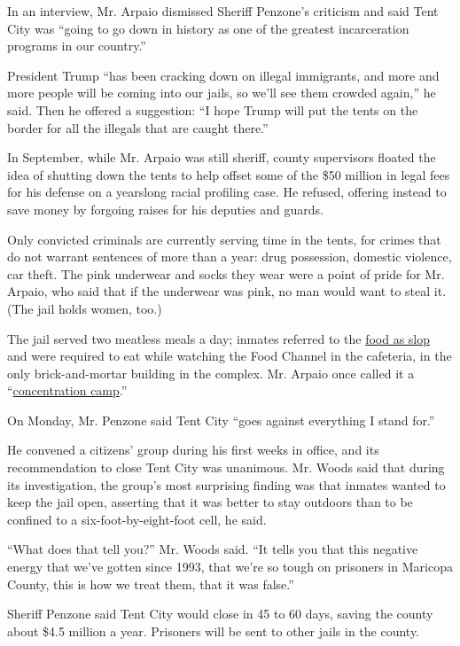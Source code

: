 In an interview, Mr. Arpaio dismissed Sheriff Penzone's criticism and
said Tent City was ``going to go down in history as one of the greatest
incarceration programs in our country.''

President Trump ``has been cracking down on illegal immigrants, and more
and more people will be coming into our jails, so we'll see them crowded
again,'' he said. Then he offered a suggestion: ``I hope Trump will put
the tents on the border for all the illegals that are caught there.''

In September, while Mr. Arpaio was still sheriff, county supervisors
floated the idea of shutting down the tents to help offset some of the
\$50 million in legal fees for his defense on a yearslong racial
profiling case. He refused, offering instead to save money by forgoing
raises for his deputies and guards.

Only convicted criminals are currently serving time in the tents, for
crimes that do not warrant sentences of more than a year: drug
possession, domestic violence, car theft. The pink underwear and socks
they wear were a point of pride for Mr. Arpaio, who said that if the
underwear was pink, no man would want to steal it. (The jail holds
women, too.)

The jail served two meatless meals a day; inmates referred to the
\href{https://www.facebookcorewwwi.onion/ThisIsFernanda/videos/vb.656347072/10153670451937073/?type=2\&theater}{food
as slop} and were required to eat while watching the Food Channel in the
cafeteria, in the only brick-and-mortar building in the complex. Mr.
Arpaio once called it a
``\href{https://www.youtube.com/watch?v=1fj3mRGQ0ow}{concentration
camp}.''

On Monday, Mr. Penzone said Tent City ``goes against everything I stand
for.''

He convened a citizens' group during his first weeks in office, and its
recommendation to close Tent City was unanimous. Mr. Woods said that
during its investigation, the group's most surprising finding was that
inmates wanted to keep the jail open, asserting that it was better to
stay outdoors than to be confined to a six-foot-by-eight-foot cell, he
said.

``What does that tell you?'' Mr. Woods said. ``It tells you that this
negative energy that we've gotten since 1993, that we're so tough on
prisoners in Maricopa County, this is how we treat them, that it was
false.''

Sheriff Penzone said Tent City would close in 45 to 60 days, saving the
county about \$4.5 million a year. Prisoners will be sent to other jails
in the county.


